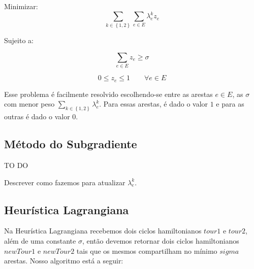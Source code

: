 \documentclass{article}
\newcommand{\Set}[1]{\ensuremath{\left\{#1\right\}}}
\newcommand{\Sum}[1]{\ensuremath{\displaystyle\sum\limits_{#1}}}
\newcommand{\edge}{\ensuremath{e}}
\newcommand{\edges}{\ensuremath{E}}
\newcommand{\ncycles}{2}
\newcommand{\allCycles}{\ensuremath{\Set{1, \ncycles}}}
\newcommand{\cycle}{\ensuremath{k}}
\newcommand{\Z}{\ensuremath{z}}
\newcommand{\ze}{\ensuremath{\Z_{\edge}}}
\newcommand{\similarity}{\ensuremath{\sigma}}
\newcommand{\lagrange}{\ensuremath{\lambda}}
\newcommand{\lagrangeke}{\ensuremath{\lagrange_{\edge}^{\cycle}}}
\begin{document}
Minimizar:
\begin{equation}
 	\Sum{\cycle \in \allCycles}
 	\Sum{\edge \in \edges}
	\lagrangeke \ze
\end{equation}

Sujeito a:

\begin{equation}
	\Sum{\edge \in \edges} \ze \geqslant \similarity
\end{equation}

\begin{equation}
	\label{constraint:value of ze}
	0 \leqslant \ze \leqslant 1
	\qquad
	\forall \edge \in \edges
\end{equation}

Esse problema é facilmente resolvido escolhendo-se entre as arestas $\edge \in \edges$, as $\similarity$ com menor peso $\Sum{\cycle \in \allCycles} \lagrangeke$. Para essas arestas, é dado o valor $1$ e para as outras é dado o valor $0$.

\subsection{Método do Subgradiente}

{\huge TO DO}

Descrever como fazemos para atualizar $\lagrangeke$.

\subsection{Heurística Lagrangiana}
Na Heurística Lagrangiana recebemos dois ciclos hamiltonianos $tour1$ e $tour2$, além de uma constante $\sigma$, então devemos retornar dois ciclos hamiltonianos $newTour1$ e $newTour2$ tais que os mesmos compartilham no mínimo $sigma$ arestas. Nosso algoritmo está a seguir:
\end{document}
